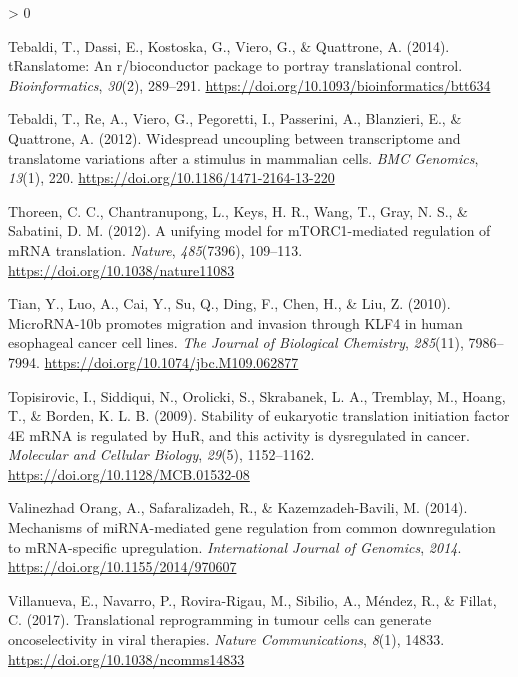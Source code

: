 \documentclass[
  12pt,
  openany]{book}
\newlength{\cslhangindent}
\newenvironment{CSLReferences}[2] %
 {%
  \setlength{\parindent}{0pt}
  \ifodd #1 \everypar{\setlength{\hangindent}{\cslhangindent}}\ignorespaces\fi
  \ifnum #2 > 0
  \setlength{\parskip}{#2\baselineskip}
  \fi
 }%
 {}
\begin{document}
\begin{CSLReferences}{1}{0}
\leavevmode\hypertarget{ref-Tebaldi2014}{}%
Tebaldi, T., Dassi, E., Kostoska, G., Viero, G., \& Quattrone, A. (2014). {tRanslatome}: An r/bioconductor package to portray translational control. \emph{Bioinformatics}, \emph{30}(2), 289--291. \url{https://doi.org/10.1093/bioinformatics/btt634}

\leavevmode\hypertarget{ref-Tebaldi2012}{}%
Tebaldi, T., Re, A., Viero, G., Pegoretti, I., Passerini, A., Blanzieri, E., \& Quattrone, A. (2012). Widespread uncoupling between transcriptome and translatome variations after a stimulus in mammalian cells. \emph{{BMC} Genomics}, \emph{13}(1), 220. \url{https://doi.org/10.1186/1471-2164-13-220}

\leavevmode\hypertarget{ref-Thoreen2012}{}%
Thoreen, C. C., Chantranupong, L., Keys, H. R., Wang, T., Gray, N. S., \& Sabatini, D. M. (2012). A unifying model for {mTORC}1-mediated regulation of {mRNA} translation. \emph{Nature}, \emph{485}(7396), 109--113. \url{https://doi.org/10.1038/nature11083}

\leavevmode\hypertarget{ref-Tian2010}{}%
Tian, Y., Luo, A., Cai, Y., Su, Q., Ding, F., Chen, H., \& Liu, Z. (2010). {MicroRNA}-10b promotes migration and invasion through {KLF}4 in human esophageal cancer cell lines. \emph{The Journal of Biological Chemistry}, \emph{285}(11), 7986--7994. \url{https://doi.org/10.1074/jbc.M109.062877}

\leavevmode\hypertarget{ref-Topisirovic2009}{}%
Topisirovic, I., Siddiqui, N., Orolicki, S., Skrabanek, L. A., Tremblay, M., Hoang, T., \& Borden, K. L. B. (2009). Stability of eukaryotic translation initiation factor 4E {mRNA} is regulated by {HuR}, and this activity is dysregulated in cancer. \emph{Molecular and Cellular Biology}, \emph{29}(5), 1152--1162. \url{https://doi.org/10.1128/MCB.01532-08}

\leavevmode\hypertarget{ref-ValinezhadOrang2014}{}%
Valinezhad Orang, A., Safaralizadeh, R., \& Kazemzadeh-Bavili, M. (2014). Mechanisms of {miRNA}-mediated gene regulation from common downregulation to {mRNA}-specific upregulation. \emph{International Journal of Genomics}, \emph{2014}. \url{https://doi.org/10.1155/2014/970607}

\leavevmode\hypertarget{ref-Villanueva2017}{}%
Villanueva, E., Navarro, P., Rovira-Rigau, M., Sibilio, A., Méndez, R., \& Fillat, C. (2017). Translational reprogramming in tumour cells can generate oncoselectivity in viral therapies. \emph{Nature Communications}, \emph{8}(1), 14833. \url{https://doi.org/10.1038/ncomms14833}


\end{CSLReferences}
\end{document}
